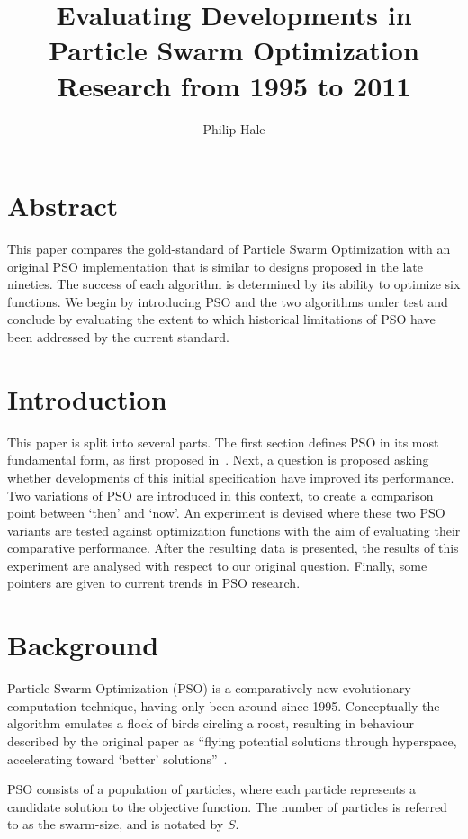 \documentclass{csfourzero}
\author{Philip Hale}
\title{Evaluating Developments in Particle Swarm Optimization Research from
1995 to 2011}
\begin{document}
\maketitle

\section{Abstract}

This paper compares the gold-standard of Particle Swarm Optimization with an
original PSO implementation that is similar to designs proposed in the late
nineties.  The success of each algorithm is determined by its ability to
optimize six functions. We begin by introducing PSO and the two algorithms under
test and conclude by evaluating the extent to which historical limitations of
PSO have been addressed by the current standard.

\section{Introduction}

This paper is split into several parts. The first section defines PSO in its
most fundamental form, as first proposed in~\cite{Kennedy:1995bi}. Next, a
question is proposed asking whether developments of this initial specification
have improved its performance. Two variations of PSO are introduced in this
context, to create a comparison point between `then' and `now'. An experiment
is devised where these two PSO variants are tested against optimization
functions with the aim of evaluating their comparative performance. After the
resulting data is presented, the results of this experiment are analysed with
respect to our original question. Finally, some pointers are given to current
trends in PSO research.

\section{Background}

Particle Swarm Optimization (PSO) is a comparatively new evolutionary
computation technique, having only been around since 1995.  Conceptually the
algorithm emulates a flock of birds circling a roost, resulting in  behaviour
described by the original paper as ``flying potential solutions through
hyperspace, accelerating toward `better' solutions''~\cite{Kennedy:1995bi}.

PSO consists of a population of particles, where each particle represents a
candidate solution to the objective function.  The number of particles is
referred to as the swarm-size, and is notated by $S$.
\end{document}
